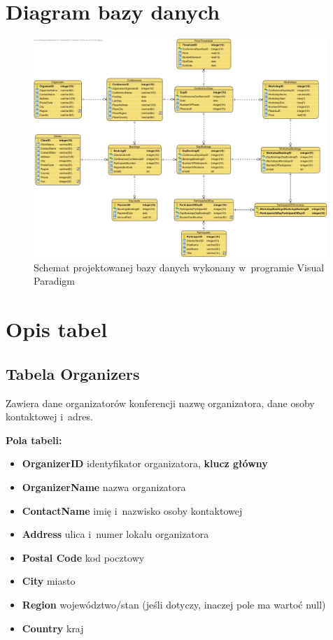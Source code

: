 \documentclass[12pt, a4paper]{mwrep}
\begin{document}
\section{Diagram bazy danych}

\begin{figure}[h]
  \centering
  \includegraphics[width=0.99\textwidth]{pictures/scheme.jpg}
  \caption{Schemat projektowanej bazy danych wykonany w~programie Visual Paradigm}
  \label{rys:schemat}
\end{figure}

\newpage
\section{Opis tabel}

\subsection{Tabela Organizers}

\noindent Zawiera dane organizatorów konferencji \ppauza nazwę organizatora, dane osoby kontaktowej i~adres.

\vspace{0.5cm}

\noindent \textbf{Pola tabeli:}
\begin{itemize}
  \item \textbf{OrganizerID} \ppauza identyfikator organizatora, \textbf{klucz główny}
  \item \textbf{OrganizerName} \ppauza nazwa organizatora
  \item \textbf{ContactName} \ppauza imię i~nazwisko osoby kontaktowej
  \item \textbf{Address} \ppauza ulica i~numer lokalu organizatora
  \item \textbf{Postal Code} \ppauza kod pocztowy
  \item \textbf{City} \ppauza miasto
  \item \textbf{Region} \ppauza województwo/stan (jeśli dotyczy, inaczej pole ma wartoć null)
  \item \textbf{Country} \ppauza kraj
\end{itemize}
\end{document}
